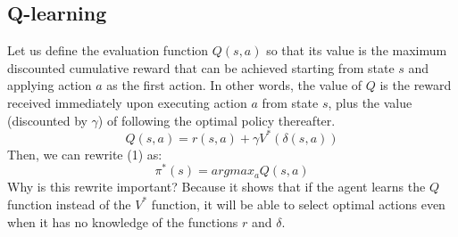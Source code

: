 \subsection{Q-learning}
Let us define the evaluation function $Q(s, a)$ so that its value is the maximum discounted cumulative reward that can be achieved starting from state $s$ and applying action $a$ as the first action. In other words, the value of $Q$ is the reward received immediately upon executing action $a$ from state $s$, plus the value  (discounted by $\gamma$) of following the optimal policy thereafter.
\[Q(s,a) = r(s,a) + \gamma V^*(\delta(s,a))\]
Then, we can rewrite (1) as:
\[\pi^* (s) = argmax_a Q(s,a)\]
Why is this rewrite  important? Because it shows that if the agent learns the $Q$ function instead of the $V^*$ function, it will be  able to select optimal actions even when it has no knowledge of the functions $r$ and $\delta$.


